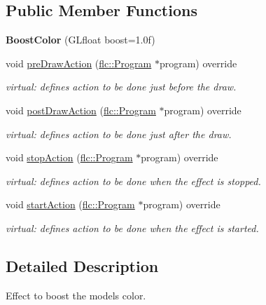 \subsection*{Public Member Functions}
\begin{DoxyCompactItemize}
\item 
\mbox{\label{classflw_1_1flf_1_1BoostColor_a2440c2e5456e839fa68d5b0b7a777383}} 
{\bfseries Boost\+Color} (G\+Lfloat boost=1.\+0f)
\item 
void \hyperlink{classflw_1_1flf_1_1BoostColor_a254c40ad807688df7bc7c8a2b8735338}{pre\+Draw\+Action} (\hyperlink{classflw_1_1flc_1_1Program}{flc\+::\+Program} $\ast$program) override
\begin{DoxyCompactList}\small\item\em virtual\+: defines action to be done just before the draw. \end{DoxyCompactList}\item 
void \hyperlink{classflw_1_1flf_1_1BoostColor_a8ef5c9e32f4b210a4240d454021e4408}{post\+Draw\+Action} (\hyperlink{classflw_1_1flc_1_1Program}{flc\+::\+Program} $\ast$program) override
\begin{DoxyCompactList}\small\item\em virtual\+: defines action to be done just after the draw. \end{DoxyCompactList}\item 
void \hyperlink{classflw_1_1flf_1_1BoostColor_a80c34ed26ed847e39fc036baad24e1d5}{stop\+Action} (\hyperlink{classflw_1_1flc_1_1Program}{flc\+::\+Program} $\ast$program) override
\begin{DoxyCompactList}\small\item\em virtual\+: defines action to be done when the effect is stopped. \end{DoxyCompactList}\item 
void \hyperlink{classflw_1_1flf_1_1BoostColor_a4bd0b925fea15ce7fc00296e3d2672e6}{start\+Action} (\hyperlink{classflw_1_1flc_1_1Program}{flc\+::\+Program} $\ast$program) override
\begin{DoxyCompactList}\small\item\em virtual\+: defines action to be done when the effect is started. \end{DoxyCompactList}\end{DoxyCompactItemize}


\subsection{Detailed Description}
Effect to boost the models color. 

